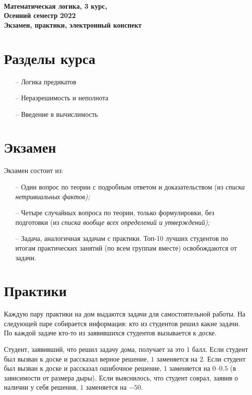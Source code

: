 \documentclass[a4paper,12pt]{article}
\begin{document}
\begin{center} {\LARGE\bf \ \\
	Математическая логика, 3 курс, \\
	Осенний семестр 2022 \\
	Экзамен, практики, электронный конспект \\}
\end{center}

\section{Разделы курса}
\begin{enumerate}
	\item[–] Логика предикатов
	\item[–] Неразрешимость и неполнота
	\item[–] Введение в вычислимость
\end{enumerate}

\section{Экзамен}

Экзамен состоит из:

\begin{enumerate}
	\item[–] Один вопрос по теории с подробным ответом и доказательством (из {\it списка нетривиальных фактов);}
	\item[–] Четыре случайных вопроса по теории, только формулировки, без подготовки (из {\it списка вообще всех определений и утверждений);}
	\item[–] Задача, аналогичная задачам с практики. Топ-10 лучших студентов по итогам практических занятий (по всем группам вместе) освобождаются от задачи.
\end{enumerate}

\section{Практики}

	Каждую пару практики на дом выдаются задачи для самостоятельной работы. На следующей паре собирается информация: кто из студентов решил какие задачи. По каждой задаче кто-то из заявившихся студентов вызывается к доске.

	Студент, заявивший, что решил задачу дома, получает за это \(1\) балл. Если студент был вызван к доске и рассказал верное решение, \(1\) заменяется на \(2\). Если студент был вызван к доске и рассказал ошибочное решение, \(1\) заменяется на \(0\)–\(0.5\) (в зависимости от размера дыры). Если выяснилось, что студент соврал, заявив о наличии у себя решения, \(1\) заменяется на \(-50\).
\end{document}
